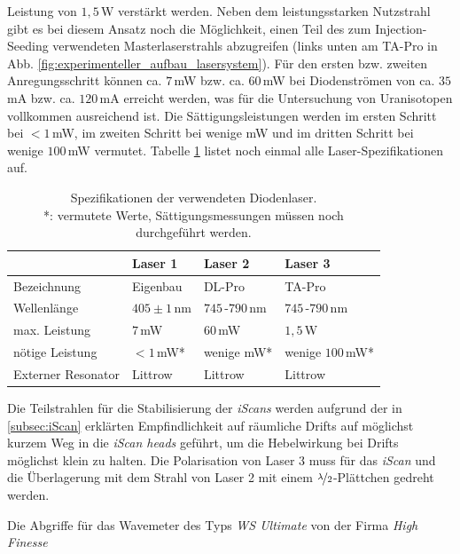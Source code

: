 Leistung von $1,5\,$W verstärkt werden. Neben dem leistungsstarken Nutzstrahl
gibt es bei diesem Ansatz noch die Möglichkeit, einen Teil des zum
Injection-Seeding verwendeten Masterlaserstrahls abzugreifen (links unten am TA-Pro in Abb.
\ref{fig:experimenteller_aufbau_lasersystem}). Für den ersten bzw.
zweiten Anregungsschritt können ca. $7\,$mW bzw. ca. $60\,$mW bei Diodenströmen von ca. $35\,$mA bzw. ca.
$120\,$mA erreicht werden, was für die Untersuchung von Uranisotopen vollkommen
ausreichend ist. Die Sättigungsleistungen werden im ersten Schritt bei $<1\,$mW,
im zweiten Schritt bei wenige mW und im dritten Schritt bei wenige $100\,$mW
vermutet.
Tabelle \ref{tab:laser_spezifikationen} listet noch einmal alle Laser-Spezifikationen auf.
\par
\begin{table}
	\begin{tabular}{p{}|p{}p{}p{}}
		\toprule
		& Laser 1 & Laser 2 & Laser 3\\
		\midrule[1px]
		\hline
		Bezeichnung & Eigenbau & DL-Pro & TA-Pro\\
		Wellenlänge & $405\pm1\,$nm & $745\,$-$790\,$nm & $745\,$-$790\,$nm\\
		max. Leistung & $7\,$mW & $60\,$mW & $1,5\,$W\\
		nötige Leistung & $<1\,$mW* & wenige mW* & wenige $100\,$mW*\\
		Externer Resonator & Littrow & Littrow & Littrow\\
		\bottomrule[1px]
	\end{tabular}
	\caption[Spezifikationen der verwendeten
	Diodenlaser]{Spezifikationen der verwendeten
	Diodenlaser.\\
	*: vermutete Werte, Sättigungsmessungen müssen noch durchgeführt werden.}
	\label{tab:laser_spezifikationen}
\end{table}
Die Teilstrahlen für die Stabilisierung der \textit{iScans} werden aufgrund der
in \ref{subsec:iScan} erklärten Empfindlichkeit auf räumliche Drifts auf
möglichst kurzem Weg in die \textit{iScan heads} geführt, um die Hebelwirkung
bei Drifts möglichst klein zu halten. Die Polarisation von Laser 3 muss für
das \textit{iScan} und die Überlagerung mit dem Strahl von Laser 2 mit einem
$\nicefrac{\lambda}{2}$-Plättchen gedreht werden.\par
Die Abgriffe für das Wavemeter des Typs \textit{WS Ultimate} von der Firma \textit{High Finesse}
